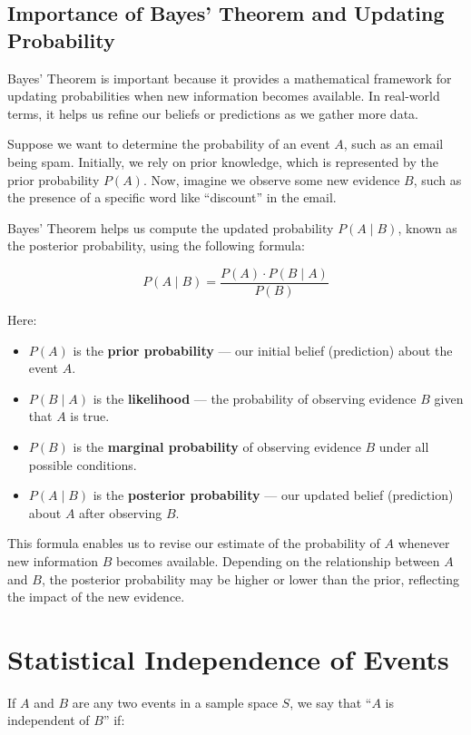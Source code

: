 \documentclass[twoside]{book}
\begin{document}
\subsection{Importance of Bayes' Theorem and Updating Probability}

Bayes’ Theorem is important because it provides a mathematical framework for updating probabilities when new information becomes available. In real-world terms, it helps us refine our beliefs or predictions as we gather more data.

Suppose we want to determine the probability of an event \( A \), such as an email being spam. Initially, we rely on prior knowledge, which is represented by the prior probability \( P(A) \). Now, imagine we observe some new evidence \( B \), such as the presence of a specific word like ``discount'' in the email.

Bayes' Theorem helps us compute the updated probability \( P(A \mid B) \), known as the posterior probability, using the following formula:

\[
P(A \mid B) = \frac{P(A) \cdot P(B \mid A)}{P(B)}
\]

Here:
\begin{itemize}
    \item \( P(A) \) is the \textbf{prior probability} — our initial belief (prediction) about the event \( A \).
    \item \( P(B \mid A) \) is the \textbf{likelihood} — the probability of observing evidence \( B \) given that \( A \) is true.
    \item \( P(B) \) is the \textbf{marginal probability} of observing evidence \( B \) under all possible conditions.
    \item \( P(A \mid B) \) is the \textbf{posterior probability} — our updated belief (prediction)  about \( A \) after observing \( B \).
\end{itemize}

This formula enables us to revise our estimate of the probability of \( A \) whenever new information \( B \) becomes available. Depending on the relationship between \( A \) and \( B \), the posterior probability may be higher or lower than the prior, reflecting the impact of the new evidence.

\section{Statistical Independence of Events}

If $A$ and $B$ are any two events in a sample space $S$, we say that ``$A$ is independent of $B$'' if:
\end{document}
